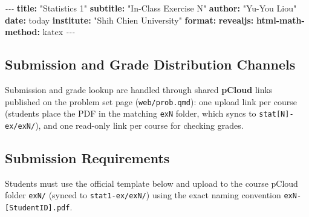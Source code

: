 \documentclass[
]{article}
\newenvironment{Shaded}{\begin{snugshade}}{\end{snugshade}}
\newcommand{\AttributeTok}[1]{\textcolor[rgb]{0.13,0.29,0.53}{#1}}
\newcommand{\FunctionTok}[1]{\textcolor[rgb]{0.13,0.29,0.53}{\textbf{#1}}}
\newcommand{\KeywordTok}[1]{\textcolor[rgb]{0.13,0.29,0.53}{\textbf{#1}}}
\newcommand{\NormalTok}[1]{#1}
\newcommand{\PreprocessorTok}[1]{\textcolor[rgb]{0.56,0.35,0.01}{\textit{#1}}}
\newcommand{\SpecialCharTok}[1]{\textcolor[rgb]{0.81,0.36,0.00}{\textbf{#1}}}
\newcommand{\StringTok}[1]{\textcolor[rgb]{0.31,0.60,0.02}{#1}}
\begin{document}
\begin{Shaded}
\begin{Highlighting}[]
\PreprocessorTok{{-}{-}{-}}
\FunctionTok{title}\KeywordTok{:}\AttributeTok{ }\StringTok{"Statistics 1"}
\FunctionTok{subtitle}\KeywordTok{:}\AttributeTok{ }\StringTok{"In{-}Class Exercise N"}
\FunctionTok{author}\KeywordTok{:}\AttributeTok{ }\StringTok{"Yu{-}You Liou"}
\FunctionTok{date}\KeywordTok{:}\AttributeTok{ today}
\FunctionTok{institute}\KeywordTok{:}\AttributeTok{ }\StringTok{"Shih Chien University"}
\FunctionTok{format}\KeywordTok{:}
\AttributeTok{  }\FunctionTok{revealjs}\KeywordTok{:}
\AttributeTok{    }\FunctionTok{html{-}math{-}method}\KeywordTok{:}\AttributeTok{ katex}
\PreprocessorTok{{-}{-}{-}}
\end{Highlighting}
\end{Shaded}

\subsection{Submission and Grade Distribution
Channels}\label{submission-and-grade-distribution-channels}

Submission and grade lookup are handled through shared \textbf{pCloud}
links published on the problem set page (\texttt{web/prob.qmd}): one
upload link per course (students place the PDF in the matching
\texttt{exN} folder, which syncs to \texttt{stat{[}N{]}-ex/exN/}), and
one read-only link per course for checking grades.

\subsection{Submission Requirements}\label{submission-requirements}

Students must use the official template below and upload to the course
pCloud folder \texttt{exN/} (synced to \texttt{stat1-ex/exN/}) using the
exact naming convention \texttt{exN-{[}StudentID{]}.pdf}.

\begin{Shaded}
\end{Shaded}
\end{document}
